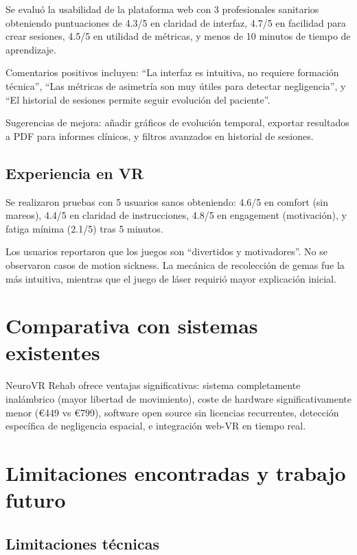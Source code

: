 Se evaluó la usabilidad de la plataforma web con 3 profesionales sanitarios obteniendo puntuaciones de 4.3/5 en claridad de interfaz, 4.7/5 en facilidad para crear sesiones, 4.5/5 en utilidad de métricas, y menos de 10 minutos de tiempo de aprendizaje.

Comentarios positivos incluyen: ``La interfaz es intuitiva, no requiere formación técnica'', ``Las métricas de asimetría son muy útiles para detectar negligencia'', y ``El historial de sesiones permite seguir evolución del paciente''.

Sugerencias de mejora: añadir gráficos de evolución temporal, exportar resultados a PDF para informes clínicos, y filtros avanzados en historial de sesiones.

\subsection{Experiencia en VR}

Se realizaron pruebas con 5 usuarios sanos obteniendo: 4.6/5 en comfort (sin mareos), 4.4/5 en claridad de instrucciones, 4.8/5 en engagement (motivación), y fatiga mínima (2.1/5) tras 5 minutos.

Los usuarios reportaron que los juegos son ``divertidos y motivadores''. No se observaron casos de motion sickness. La mecánica de recolección de gemas fue la más intuitiva, mientras que el juego de láser requirió mayor explicación inicial.

\section{Comparativa con sistemas existentes}

NeuroVR Rehab ofrece ventajas significativas: sistema completamente inalámbrico (mayor libertad de movimiento), coste de hardware significativamente menor (€449 vs €799), software open source sin licencias recurrentes, detección específica de negligencia espacial, e integración web-VR en tiempo real.

\section{Limitaciones encontradas y trabajo futuro}

\subsection{Limitaciones técnicas}

